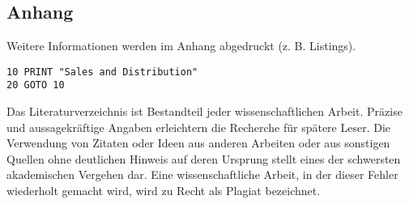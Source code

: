 \begin{appendix}

\section{Anhang}
Weitere Informationen werden im Anhang abgedruckt (z. B. Listings).

\begin{verbatim}
10 PRINT "Sales and Distribution"
20 GOTO 10
\end{verbatim}

\newpage
Das Literaturverzeichnis ist Bestandteil jeder wissenschaftlichen Arbeit. Präzise und aussagekräftige Angaben erleichtern die Recherche für spätere Leser. Die Verwendung von Zitaten oder Ideen aus anderen Arbeiten oder aus sonstigen Quellen ohne deutlichen Hinweis auf deren Ursprung stellt eines der schwersten akademischen Vergehen dar. Eine wissenschaftliche Arbeit, in der dieser Fehler wiederholt gemacht wird, wird zu Recht als Plagiat bezeichnet.


\end{appendix}
\newpage
